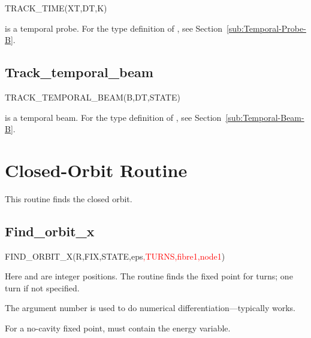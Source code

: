 %
\begin{ptccode}
TRACK_TIME(XT,DT,K)
\end{ptccode}

 is a temporal probe. For the type definition of ,
see Section~\ref{sub:Temporal-Probe-B}.


\subsection{Track_temporal_beam}

%
\begin{ptccode}
TRACK_TEMPORAL_BEAM(B,DT,STATE)
\end{ptccode}

 is a temporal beam. For the type definition of ,
see Section~\ref{sub:Temporal-Beam-B}.


\section{Closed-Orbit Routine}

%
This routine finds the closed orbit.


\subsection{Find_orbit_x}
\label{sub:Find-Orbit-X}

%
\begin{ptccode}
FIND_ORBIT_X(R,FIX,STATE,eps\textcolor{red}{,TURNS,fibre1,node1})
\end{ptccode}

Here  and  are integer positions. The routine finds the
fixed point for  turns; one turn if not specified.

The argument  number is used to do numerical
differentiation---typically  works.

For a no-cavity fixed point,  must contain the energy variable.

\endinput
